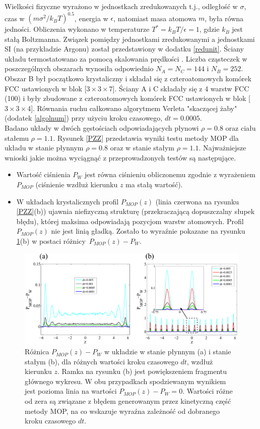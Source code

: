 \documentclass[12pt,a4paper,openright]{report} %
\begin{document}
Wielkości fizyczne wyrażono w jednostkach zredukowanych t.j., odległość w $\sigma$, czas w $(m\sigma^{2}/k_{B}T)^{0.5}$, energia w $\epsilon$, natomiast masa atomowa $m$, była równa jedności. Obliczenia wykonano w temperaturze $T^{*}=k_{B}T/\epsilon =1$, gdzie $k_{B}$ jest stałą Boltzmanna. Związek pomiędzy jednostkami zredukowanymi a jednostkami SI (na przykładzie Argonu) został przedstawiony w dodatku \ref{redunit}. Ściany układu termostatowano za pomocą skalowania prędkości \cite{Woodcock1971}. 
%
Liczba cząsteczek w poszczególnych obszarach wynosiła odpowiednio $N_{A}=N_{C}=144$ i $N_{B}=252$. Obszar B był początkowo krystaliczny i składał się z czteroatomowych komórek FCC ustawionych w blok [$3\times 3 \times 7$]. Ściany A i C składały się z 4 warstw FCC (100) i były zbudowane z czteroatomowych komórek FCC ustawionych w blok [$3 \times 3 \times 4$]. \linebreak Równania ruchu całkowano algorytmem Verleta "skaczącej żaby" (dodatek \ref{algolnum}) przy użyciu kroku czasowego, $dt=0.0005$. \\
Badano układy w dwóch gęstościach odpowiadających płynowi $\rho=0.8$ oraz ciału stałemu $\rho=1.1$. 
%
%
Rysunek \ref{PZZ} przedstawia wyniki testu metody MOP dla układu w stanie płynnym $\rho=0.8$ oraz w stanie stałym $\rho=1.1$. 
%
%
Najważniejsze wnioski jakie można wyciągnąć z przeprowadzonych testów są następujące.
\begin{itemize}
\item{Wartość ciśnienia $P_W$ jest równa ciśnieniu obliczonemu zgodnie z wyrażeniem $P_{MOP}$ (ciśnienie wzdłuż kierunku $z$ ma stałą wartość).}
\item{W układach krystalicznych profil $P_{MOP}(z)$ (linia czerwona na rysunku \ref{PZZ}(b)) ujawnia niefizyczną strukturę (przekraczającą dopuszczalny słupek błędu), której maksima odpowiadają pozycjom warstw atomowych. Profil $P_{MOP}(z)$ nie jest linią gładką. Zostało to wyraźnie pokazane na rysunku \ref{PMOP-PW}(b) w postaci różnicy~$P_{MOP}(z)-P_W$.}
\end{itemize}
%
\begin{figure}[h]
\centering
\includegraphics[width=150mm]{rysunki/PMOP-PW.pdf}
\caption{Różnica $P_{MOP}(z)-P_W$ w układzie w stanie płynnym (a) i stanie stałym (b), dla różnych wartości kroku czasowego $dt$, wzdłuż kierunku $z$. Ramka na rysunku (b) jest powiększeniem fragmentu głównego wykresu. W obu przypadkach spodziewanym wynikiem jest pozioma linia na wartości $P_{MOP}(z)-P_W=0$. Wartości różne od zera są związane z błędem generowanym przez kinetyczną część metody MOP, na co wskazuje wyraźna zależność od dobranego kroku czasowego $dt$.}
\label{PMOP-PW}
\end{figure}
\end{document}
